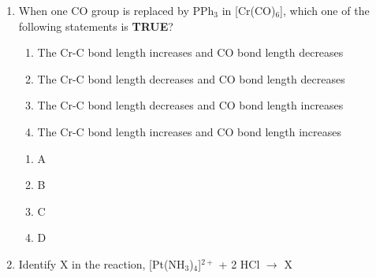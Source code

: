 \documentclass[journal,12pt,onecolumn]{exam}
\theoremstyle{remark}
\newcommand{\correct}{\textcolor{correctgreen}{\checkmark}}
\newcommand{\wrong}{\textcolor{wrongred}{\ding{55}}} %
\begin{document}
\begin{enumerate}
\begin{enumerate}
    \item D$_{6h}$
    \item D$_{5h}$
    \item C$_{6v}$
    \item C$_{5v}$
\end{enumerate}

\hfill{}

\begin{multicols}{2}
\begin{enumerate}[leftmargin=*, align=left]
    \item \wrong A
    \item \correct B
    \item \wrong C
    \item \wrong D
\end{enumerate}
\end{multicols}






\item 
When one CO group is replaced by PPh$_3$ in [Cr(CO)$_6$], which one of the following statements is \textbf{TRUE}?

\begin{enumerate}
    \item The Cr-C bond length increases and CO bond length decreases
    \item The Cr-C bond length decreases and CO bond length decreases
    \item The Cr-C bond length decreases and CO bond length increases
    \item The Cr-C bond length increases and CO bond length increases
\end{enumerate}

\hfill{}

\begin{multicols}{2}
\begin{enumerate}[leftmargin=*, align=left]
    \item \wrong A
    \item \correct B
    \item \wrong C
    \item \wrong D
\end{enumerate}
\end{multicols}


\item 
Identify X in the reaction, [Pt(NH$_3$)$_4$]$^{2+}$ + 2 HCl $\rightarrow$ X


\end{enumerate}
\end{document}
